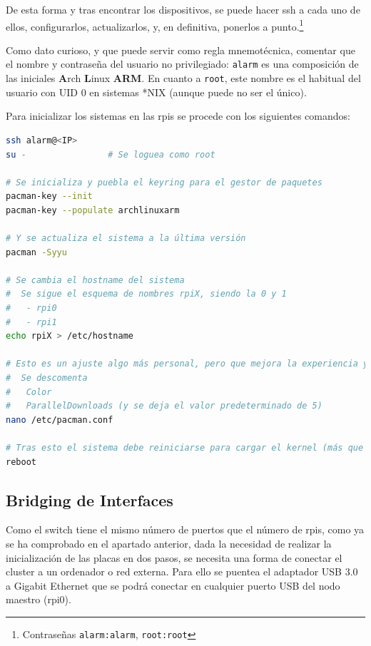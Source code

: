 De esta forma y tras encontrar los dispositivos, se puede hacer \acrshort{ssh} a cada uno de ellos, configurarlos, actualizarlos, y, en definitiva, ponerlos a punto.\footnote{Contraseñas \texttt{alarm:alarm}, \texttt{root:root}}

Como dato curioso, y que puede servir como regla mnemotécnica, comentar que el nombre y contraseña del usuario no privilegiado: \texttt{alarm} es una composición de las iniciales \textbf{A}rch \textbf{L}inux \textbf{ARM}. En cuanto a \texttt{root}, este nombre es el habitual del usuario con UID 0 en sistemas *NIX (aunque puede no ser el único).

Para inicializar los sistemas en las \acrshort{rpi}s se procede con los siguientes comandos:

\begin{lstlisting}[language=bash]
ssh alarm@<IP>
su -                # Se loguea como root

# Se inicializa y puebla el keyring para el gestor de paquetes
pacman-key --init
pacman-key --populate archlinuxarm

# Y se actualiza el sistema a la última versión
pacman -Syyu

# Se cambia el hostname del sistema
#  Se sigue el esquema de nombres rpiX, siendo la 0 y 1
#   - rpi0
#   - rpi1
echo rpiX > /etc/hostname

# Esto es un ajuste algo más personal, pero que mejora la experiencia y velocidad en las actualizaciones: se edita el archivo /etc/pacman.conf
#  Se descomenta
#   Color
#   ParallelDownloads (y se deja el valor predeterminado de 5)
nano /etc/pacman.conf

# Tras esto el sistema debe reiniciarse para cargar el kernel (más que probablemente) actualizado. Tras el arranque se debe verificar que todo funcione correctamente.
reboot
\end{lstlisting}

\subsection{Bridging de Interfaces}
Como el switch tiene el mismo número de puertos que el número de \acrshort{rpi}s, como ya se ha comprobado en el apartado anterior, dada la necesidad de realizar la inicialización de las placas en dos pasos, se necesita una forma de conectar el cluster a un ordenador o red externa. Para ello se puentea el adaptador USB 3.0 a Gigabit Ethernet que se podrá conectar en cualquier puerto USB del nodo maestro (rpi0).

